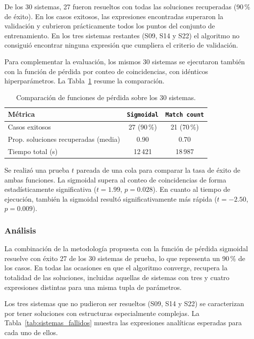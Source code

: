 \documentclass{article} \usepackage[utf8]{inputenc} \usepackage[spanish]{babel} \usepackage{amsmath, amssymb, amsthm} \usepackage{bm} \usepackage{float} \usepackage{longtable} \usepackage[hidelinks]{hyperref} \spanishdecimal{.}
\begin{document}
De los 30 sistemas, 27 fueron resueltos con todas las soluciones recuperadas (90\,\% de éxito). En los casos exitosos, las expresiones encontradas superaron la validación y cubrieron prácticamente todos los puntos del conjunto de entrenamiento. En los tres sistemas restantes (S09, S14 y S22) el algoritmo no consiguió encontrar ninguna expresión que cumpliera el criterio de validación.

\bigskip Para complementar la evaluación, los mismos 30 sistemas se ejecutaron también con la función de pérdida por conteo de coincidencias, con idénticos hiperparámetros. La Tabla~\ref{tab:comparacion_sistemas_loss} resume la comparación.

\begin{table}[H] \centering \caption{Comparación de funciones de pérdida sobre los 30 sistemas.} \label{tab:comparacion_sistemas_loss} \begin{tabular}{lcc} \hline
Métrica & \texttt{Sigmoidal} & \texttt{Match count} \\
\hline
Casos exitosos & 27 (90\,\%) & 21 (70\,\%) \\
Prop. soluciones recuperadas (media) & 0.90 & 0.70 \\
Tiempo total (s) & 12\,421 & 18\,987 \\
\hline \end{tabular} \end{table}

Se realizó una prueba $t$ pareada de una cola para comparar la tasa de éxito de ambas funciones. La sigmoidal supera al conteo de coincidencias de forma estadísticamente significativa ($t = 1.99$, $p = 0.028$). En cuanto al tiempo de ejecución, también la sigmoidal resultó significativamente más rápida ($t = -2.50$, $p = 0.009$).

\subsubsection{Análisis} \label{sec:analisis_fase2}

La combinación de la metodología propuesta con la función de pérdida sigmoidal resuelve con éxito 27 de los 30 sistemas de prueba, lo que representa un 90\,\% de los casos. En todas las ocasiones en que el algoritmo converge, recupera la totalidad de las soluciones, incluidas aquellas de sistemas con tres y cuatro expresiones distintas para una misma tupla de parámetros.

Los tres sistemas que no pudieron ser resueltos (S09, S14 y S22) se caracterizan por tener soluciones con estructuras especialmente complejas. La Tabla~\ref{tab:sistemas_fallidos} muestra las expresiones analíticas esperadas para cada uno de ellos.
\end{document}
